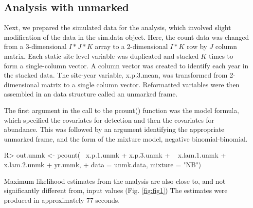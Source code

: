 \documentclass[article]{jss}
\begin{document}
\subsection[Analysis with unmarked]{Analysis with unmarked}
Next, we prepared the simulated data for the  analysis, which involved slight modification of the data in the sim.data object.  Here, the count data was changed from a 3-dimensional $I*J*K$ array to a 2-dimensional $I*K$ row by $J$ column matrix.  Each static site level variable was duplicated and stacked $K$ times to form a single-column vector. A column vector was created to identify each year in the stacked data.  The site-year variable, x.p.3.mean, was transformed from 2-dimensional matrix to a single column vector.  Reformatted variables were then assembled in an  data structure called an unmarked frame.


The first argument in the call to the pcount() function was the model formula, which specified the covariates for detection and then the covariates for abundance.  This was followed by an argument identifying the appropriate unmarked frame, and the form of the mixture model, negative binomial-binomial.

\begin{Code}
R> out.unmk <- pcount(~ x.p.1.unmk + x.p.3.unmk
+                     ~ x.lam.1.unmk + x.lam.2.unmk + yr.unmk,
+                     data = unmk.data, mixture = "NB")
\end{Code}

Maximum likelihood estimates from the  analysis are also close to, and not significantly different from, input values (Fig. \ref{fig:fig1})  The  estimates were produced in approximately 77 seconds.
\end{document}
